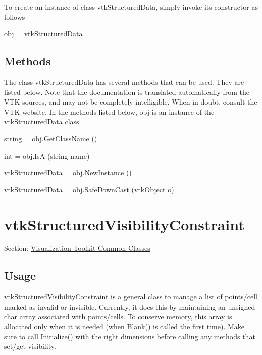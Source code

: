 To create an instance of class vtk\-Structured\-Data, simply invoke its constructor as follows \begin{DoxyVerb}  obj = vtkStructuredData
\end{DoxyVerb}
 \hypertarget{vtkwidgets_vtkxyplotwidget_Methods}{}\subsection{Methods}\label{vtkwidgets_vtkxyplotwidget_Methods}
The class vtk\-Structured\-Data has several methods that can be used. They are listed below. Note that the documentation is translated automatically from the V\-T\-K sources, and may not be completely intelligible. When in doubt, consult the V\-T\-K website. In the methods listed below, {\ttfamily obj} is an instance of the vtk\-Structured\-Data class. 
\begin{DoxyItemize}
\item {\ttfamily string = obj.\-Get\-Class\-Name ()}  
\item {\ttfamily int = obj.\-Is\-A (string name)}  
\item {\ttfamily vtk\-Structured\-Data = obj.\-New\-Instance ()}  
\item {\ttfamily vtk\-Structured\-Data = obj.\-Safe\-Down\-Cast (vtk\-Object o)}  
\end{DoxyItemize}\hypertarget{vtkcommon_vtkstructuredvisibilityconstraint}{}\section{vtk\-Structured\-Visibility\-Constraint}\label{vtkcommon_vtkstructuredvisibilityconstraint}
Section\-: \hyperlink{sec_vtkcommon}{Visualization Toolkit Common Classes} \hypertarget{vtkwidgets_vtkxyplotwidget_Usage}{}\subsection{Usage}\label{vtkwidgets_vtkxyplotwidget_Usage}
vtk\-Structured\-Visibility\-Constraint is a general class to manage a list of points/cell marked as invalid or invisible. Currently, it does this by maintaining an unsigned char array associated with points/cells. To conserve memory, this array is allocated only when it is needed (when Blank() is called the first time). Make sure to call Initialize() with the right dimensions before calling any methods that set/get visibility.

